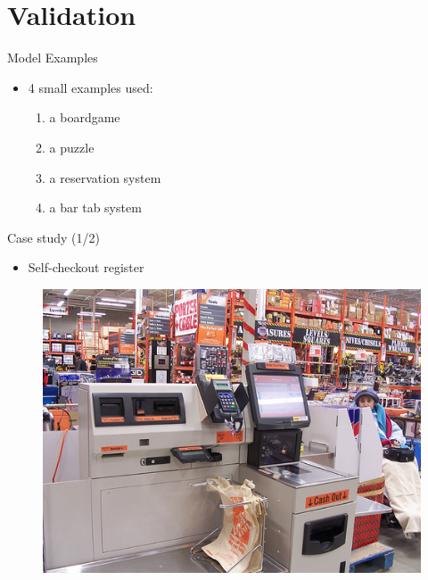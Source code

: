 \documentclass{FMTslides}
\begin{document}
\section[Validation]{Validation}

\begin{frame}{Model Examples}
\begin{itemize}[<+->]
  \item 4 small examples used:
  \begin{enumerate}
    \item a boardgame
    \item a puzzle
    \item a reservation system
    \item a bar tab system
  \end{enumerate}
\end{itemize}
\end{frame}

\begin{frame}{Case study (1/2)}
  \begin{itemize}[<+->]
  \item Self-checkout register
\end{itemize}
\begin{figure}
\centering\includegraphics[scale=0.4]{./figures/self-check-out.jpg}
\end{figure}
\end{frame}
\end{document}
